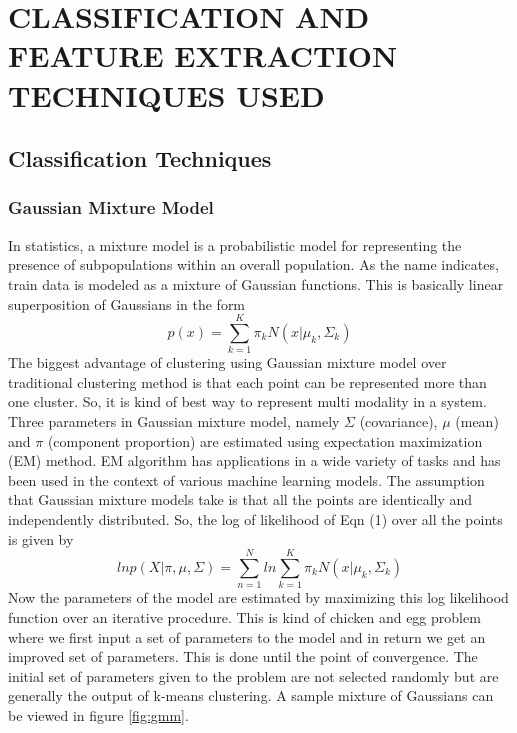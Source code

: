 \appendix
\label{app:class}
\chapter{CLASSIFICATION AND FEATURE EXTRACTION TECHNIQUES USED}
\section{Classification Techniques}
\subsection{Gaussian Mixture Model}
In statistics, a mixture model is a probabilistic model for representing the presence of subpopulations within an overall population. As the name indicates, train data is modeled as a mixture of Gaussian functions. This is basically linear superposition of Gaussians in the form\\
 \begin{equation}
 p(x) = \sum_{k=1}^{K}\pi_{k}N(x|\mu_{k},\Sigma_{k})
 \end{equation}
The biggest advantage of clustering using Gaussian mixture model over traditional clustering method is that each point can be represented more than one cluster. So, it is kind of best way to represent multi modality in a system. Three parameters in Gaussian mixture model, namely $\Sigma$ (covariance), $\mu$ (mean) and $\pi$ (component proportion) are estimated using expectation maximization (EM) method. EM algorithm has applications in a wide variety of tasks and has been used in the context of various machine learning models. The assumption that Gaussian mixture models take is that all the points are identically and independently distributed. So, the log of likelihood of Eqn (1) over all the points is given by
\begin{equation}
ln p(X|\pi, \mu, \Sigma) = \sum_{n=1}^{N}ln \sum_{k=1}^{K}\pi_{k}N(x|\mu_{k},\Sigma_{k})
\end{equation}  
Now the parameters of the model are estimated by maximizing this log likelihood function over an iterative procedure. This is kind of chicken and egg problem where we first input a set of parameters to the model and in return we get an improved set of parameters. This is done until the point of convergence. The initial set of parameters given to the problem are not selected randomly but are generally the output of k-means clustering. A sample mixture of Gaussians can be viewed in figure \ref{fig:gmm}.
